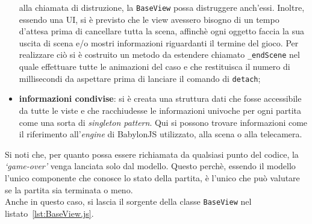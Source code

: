 \begin{itemize}
    alla chiamata di distruzione, la \texttt{BaseView} possa distruggere anch'essi. Inoltre, essendo una UI, si è previsto che le view avessero bisogno di un tempo d'attesa prima di 
    cancellare tutta la scena, affinchè ogni oggetto faccia la sua uscita di scena e/o mostri informazioni riguardanti il termine del gioco. Per realizzare ciò si è costruito un metodo 
    da estendere chiamato \texttt{\_endScene} nel quale effettuare tutte le animazioni del caso e che restituisca il numero di millisecondi da aspettare prima di lanciare il comando di 
    \texttt{detach};
    \item \textbf{informazioni condivise}: si è creata una struttura dati che fosse accessibile da tutte le viste e che racchiudesse le informazioni univoche per ogni partita come una sorta
    di \textit{singleton pattern}. Qui si possono trovare informazioni come il riferimento all'\textit{engine} di BabylonJS utilizzato, alla scena o alla telecamera.
\end{itemize}
Si noti che, per quanto possa essere richiamata da qualsiasi punto del codice, la \textit{`game-over'} venga lanciata solo dal modello. Questo perchè, essendo il modello l'unico 
componente che conosce lo stato della partita, è l'unico che può valutare se la partita sia terminata o meno.\\
Anche in questo caso, si lascia il sorgente della classe \texttt{BaseView} nel listato~\ref{lst:BaseView.js}.


